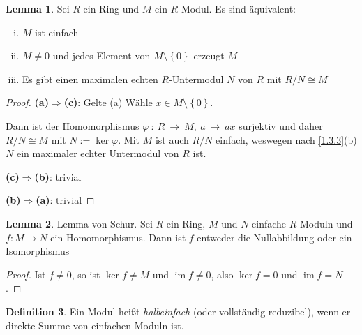 \documentclass[
twoside=semi,
fontsize=12,
DIV=12, 
cleardoublepage=current,
leqno,
headings=optiontoheadandtoc, 
toc=idx
]{scrbook}
\newcommand{\set}[1]{\left\{ #1 \right\}}
\DeclareMathOperator{\im}{im}
\theoremstyle{definition}
\newtheorem{definition}{Definition}[section]
\newtheorem{lemma}[definition]{Lemma}
\begin{document}
	\begin{lemma}\label{1.3.5}\hfill\newline
		Sei $R$ ein Ring und $M$ ein $R$-Modul. Es sind \"aquivalent:
		\begin{enumerate}[(i)]
			\item $M$ ist einfach
			\item $M \neq 0$ und jedes Element von $M \setminus \set{0}$ erzeugt $M$
			\item Es gibt einen maximalen echten $R$-Untermodul $N$ von $R$ mit $R/N \cong M$
		\end{enumerate}
	
		\begin{proof}\hfill\newline
			\textbf{(a)$\Longrightarrow$(c)}: Gelte (a) W\"ahle $x \in M \setminus \set{0}$. 
			
			Dann ist der Homomorphismus $\varphi~:~R~\to~M,~a~\mapsto~ax$ surjektiv und daher $R/N \cong M$ mit $N:=\ker \varphi$. Mit $M$ ist auch $R/N$ einfach, weswegen nach \ref{1.3.3}(b) $N$ ein maximaler echter Untermodul von $R$ ist.
			
			\medskip\noindent
			\textbf{(c)$\Longrightarrow$(b)}: trivial
			
			\medskip\noindent
			\textbf{(b)$\Longrightarrow$(a)}: trivial
		\end{proof}
	\end{lemma}

	\begin{lemma}\label{1.3.6}
		Lemma von Schur. \newline
		Sei $R$ ein Ring, $M$ und $N$ einfache $R$-Moduln und $f:M \to N$ ein Homomorphismus. Dann ist $f$ entweder die Nullabbildung oder ein Isomorphismus
		
		\begin{proof}
			Ist $f\neq 0$, so ist $\ker f \neq M$ und $\im f \neq 0$, also $\ker f = 0$ und $\im f = N$.
		\end{proof}
	\end{lemma}

	\begin{definition}\label{1.3.7}\hfill\newline
		Ein Modul hei\ss t \emph{halbeinfach} (oder vollst\"andig reduzibel), wenn er direkte Summe von einfachen Moduln ist.
	\end{definition}
\end{document}
